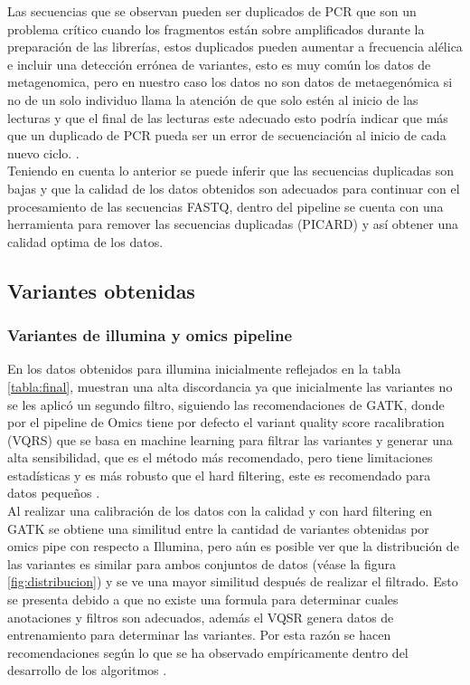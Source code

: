 Las secuencias que se  observan pueden ser duplicados de PCR que son un problema crítico cuando los fragmentos están sobre amplificados durante la preparación de las librerías, estos duplicados pueden aumentar a frecuencia alélica e incluir una detección errónea de variantes, esto es muy común los datos de metagenomica, pero en nuestro caso los datos no son datos de metaegenómica si no de un solo individuo llama la atención de que solo estén al inicio de las lecturas y que el final de las lecturas este adecuado esto podría indicar que más que un duplicado de PCR pueda ser un error de secuenciación al inicio de cada nuevo ciclo. \cite{Pandey2016}. \\

Teniendo en cuenta lo anterior se puede inferir que las secuencias duplicadas son bajas y que la calidad de los datos obtenidos son adecuados para continuar con el procesamiento de las secuencias FASTQ, dentro del pipeline se cuenta con una herramienta para remover las secuencias duplicadas (PICARD) y así obtener una calidad optima de los datos. 

\subsection*{Variantes obtenidas}
\subsubsection*{Variantes de illumina y omics pipeline}

En los datos obtenidos para illumina inicialmente reflejados en la tabla \ref{tabla:final}, muestran una alta discordancia ya que inicialmente las variantes no se les aplicó un segundo filtro, siguiendo las recomendaciones de GATK, donde por el pipeline de Omics tiene por defecto el variant quality score racalibration (VQRS) que se basa en machine learning para filtrar las variantes y generar una alta sensibilidad, que es el método más recomendado, pero tiene limitaciones estadísticas y es más robusto que el hard filtering, este es recomendado para datos pequeños \cite{Auwera2014}. \\

Al realizar una calibración de los datos con la calidad y con hard filtering en GATK se obtiene una similitud entre la cantidad de variantes obtenidas por omics pipe con respecto a Illumina, pero aún es posible ver que la distribución de las variantes es similar para ambos conjuntos de datos (véase la figura \ref{fig:distribucion}) y se ve una mayor similitud  después de realizar el filtrado. Esto se presenta debido a que no existe una formula para determinar cuales anotaciones y filtros son adecuados, además el VQSR genera datos de entrenamiento para determinar las variantes. Por esta razón se hacen recomendaciones según lo que se ha observado empíricamente dentro del desarrollo de los algoritmos \cite{Auwera2014}. \\

